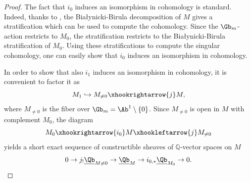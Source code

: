 \begin{proof}
The fact that $i_0$ induces an isomorphism in cohomology is standard. Indeed, thanks to \cite[Eq. 1.2.2]{Hausel-RodriguezVillega}, the Bia\l{y}nicki-Birula decomposition of $M$ gives a stratification which can be used to compute the cohomology. Since the $\Gb_m$-action restricts to $M_0$, the stratification restricts to the Bia\l{y}nicki-Birula stratification of $M_0$. Using these stratifications to compute the singular cohomology, one can easily show that $i_0$ induces an isomorphism in cohomology.

In order to show that also $i_1$ induces an isomorphism in cohomology, it is convenient to factor it as
\begin{equation}
M_1 \hookrightarrow M_{\neq 0} \xhookrightarrow{j} M,
\end{equation}
where $M_{\neq 0}$ is the fiber over $\Gb_m = \Ab^1 \setminus \{0\}$.
Since $M_{\neq 0}$ is open in $M$ with complement $M_0$, the diagram
\begin{equation}
M_0 \xhookrightarrow{i_0} M \xhookleftarrow{j} M_{\neq 0}
\end{equation}
yields a short exact sequence of constructible sheaves of $\mathbb{Q}$-vector spaces on $M$
\begin{equation} \label{Gysin sequence}
0 \to j_! \underline{\Qb}_{M \neq 0} \to \underline{\Qb}_M \to i_{0,*}\underline{\Qb}_{M_0} \to 0.
\end{equation}


\end{proof}

